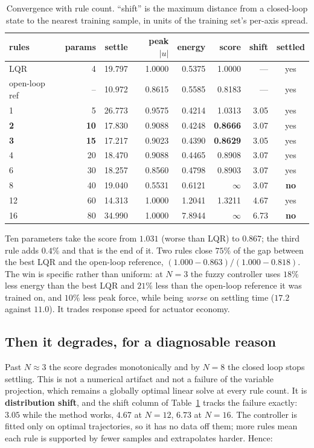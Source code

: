 \documentclass[11pt]{article}
\theoremstyle{plain}
\theoremstyle{definition}
\begin{document}
\begin{table}[t]
\centering
\caption{Convergence with rule count. ``shift'' is the maximum distance from a
closed-loop state to the nearest training sample, in units of the training
set's per-axis spread.}
\label{tab:convergence}
\begin{tabular}{lrrrrrrc}
\toprule
rules & params & settle & peak $|u|$ & energy & score & shift & settled \\
\midrule
LQR            & 4  & 19.797 & 1.0000 & 0.5375 & 1.0000 & --- & yes \\
open-loop ref  & -- & 10.972 & 0.8615 & 0.5585 & 0.8183 & --- & yes \\
1  & 5  & 26.773 & 0.9575 & 0.4214 & 1.0313 & 3.05 & yes \\
\textbf{2}  & \textbf{10} & 17.830 & 0.9088 & 0.4248 & \textbf{0.8666} & 3.07 & yes \\
\textbf{3}  & \textbf{15} & 17.217 & 0.9023 & 0.4390 & \textbf{0.8629} & 3.05 & yes \\
4  & 20 & 18.470 & 0.9088 & 0.4465 & 0.8908 & 3.07 & yes \\
6  & 30 & 18.257 & 0.8560 & 0.4798 & 0.8903 & 3.07 & yes \\
8  & 40 & 19.040 & 0.5531 & 0.6121 & $\infty$ & 3.07 & \textbf{no} \\
12 & 60 & 14.313 & 1.0000 & 1.2041 & 1.3211 & 4.67 & yes \\
16 & 80 & 34.990 & 1.0000 & 7.8944 & $\infty$ & 6.73 & \textbf{no} \\
\bottomrule
\end{tabular}
\end{table}

Ten parameters take the score from $1.031$ (worse than LQR) to $0.867$; the
third rule adds $0.4\%$ and that is the end of it. Two rules close $75\%$ of the
gap between the best LQR and the open-loop reference,
$(1.000-0.863)/(1.000-0.818)$. The win is specific rather than uniform: at
$N=3$ the fuzzy controller uses $18\%$ less energy than the best LQR and $21\%$
less than the open-loop reference it was trained on, and $10\%$ less peak force,
while being \emph{worse} on settling time ($17.2$ against $11.0$). It trades
response speed for actuator economy.

\subsection{Then it degrades, for a diagnosable reason}

Past $N\approx3$ the score degrades monotonically and by $N=8$ the closed loop
stops settling. This is not a numerical artifact and not a failure of the
variable projection, which remains a globally optimal linear solve at every rule
count. It is \textbf{distribution shift}, and the shift column of
Table~\ref{tab:convergence} tracks the failure exactly: $3.05$ while the method
works, $4.67$ at $N=12$, $6.73$ at $N=16$. The controller is fitted only on
optimal trajectories, so it has no data off them; more rules mean each rule is
supported by fewer samples and extrapolates harder. Hence:
\end{document}
